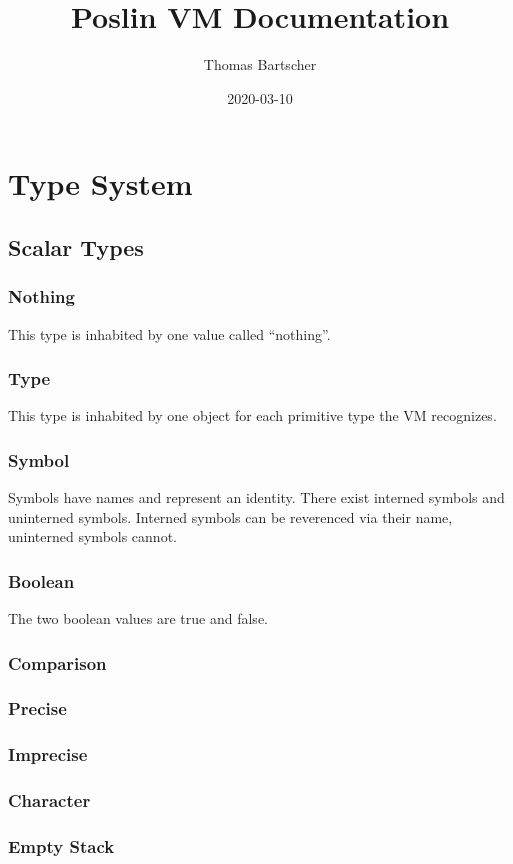 \documentclass[a4paper]{article}
\begin{document}
\title{Poslin VM Documentation}
\author{Thomas Bartscher}
\date{2020-03-10}
\maketitle

\tableofcontents


\section{Type System}
\subsection{Scalar Types}
\subsubsection{Nothing}
This type is inhabited by one value called ``nothing''.
\subsubsection{Type}
This type is inhabited by one object for each primitive type the VM recognizes.
\subsubsection{Symbol}
Symbols have names and represent an identity. There exist interned symbols and
uninterned symbols. Interned symbols can be reverenced via their name,
uninterned symbols cannot.
\subsubsection{Boolean}
The two boolean values are true and false.
\subsubsection{Comparison}
\subsubsection{Precise}
\subsubsection{Imprecise}
\subsubsection{Character}
\subsubsection{Empty Stack}
\end{document}
